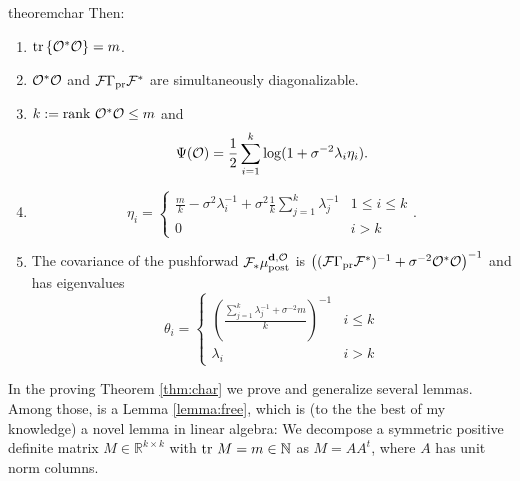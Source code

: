 \begin{restatable}{theorem}{char}
  Then:
  \begin{enumerate}
  \item  $\textup{tr}\left \{\mathcal{O}^*\mathcal{O} \right \} = m$.
  \item $\mathcal{O}^*\mathcal{O}$ and $\mathcal{F}\Gamma_{\textup{pr}}\mathcal{F}^*$ are simultaneously
    diagonalizable.
  \item $k := \textup{rank}\  \mathcal{O}^*\mathcal{O} \leq m$ and
    \begin{equation*}
      \tar(\obs) = \frac12 \sum_{i=1}^{k} \log (1 + \sigma^{-2}\lambda_i\eta_i). %
    \end{equation*}
  \item
    \begin{equation*}
        \eta_i = \begin{cases}
          \frac{m}{k} - \sigma^2 \lambda_i^{-1} + \sigma^2 \frac{1}{k} \sum_{j=1}^k \lambda_j^{-1} & 1 \leq i \leq k \\
          0 & i > k 
        \end{cases}.
    \end{equation*}
  \item The covariance of the pushforwad $\mathcal{F}_{*} \mu_{\textup{post}}^{\mathbf{d}, \mathcal{O}}$ is $\left (
    (\mathcal{F} \Gamma_{\textup{pr}} \mathcal{F}^*)^{-1} + \sigma^{-2} \mathcal{O}^*\mathcal{O} \right )^{-1}$
    and has eigenvalues
    \begin{equation*}
      \theta_i =
      \begin{cases}
        \left(\frac{\sum_{j=1}^k \lambda_j^{-1} + \sigma^{-2}m}{k} \right )^{-1} & i \leq k \\
        \lambda_i &  i > k 
      \end{cases}
    \end{equation*}
  \end{enumerate}
\end{restatable}

In the proving Theorem \ref{thm:char} we prove and generalize several
lemmas. Among those, is a Lemma \ref{lemma:free}, which is (to the the
best of my knowledge) a novel lemma in linear algebra: We decompose a
symmetric positive definite matrix $M \in \mathbb{R}^{k \times k}$
with $\textup{tr}\ M = m \in \mathbb{N}$ as $M = AA^t$, where $A$ has unit
norm columns.


